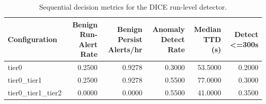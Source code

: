 \begin{table}[t]
\centering
\caption{Sequential decision metrics for the DICE run-level detector.}
\label{tab:dice_sequential_metrics}
\footnotesize
\begin{tabular}{lrrrrr}
\toprule
Configuration & Benign Run-Alert Rate & Benign Persist Alerts/hr & Anomaly Detect Rate & Median TTD (s) & Detect <=300s \\
\midrule
tier0 & 0.2500 & 0.9278 & 0.3000 & 53.5000 & 0.2000 \\
tier0_tier1 & 0.2500 & 0.9278 & 0.5500 & 77.0000 & 0.3000 \\
tier0_tier1_tier2 & 0.0000 & 0.0000 & 0.5500 & 41.0000 & 0.3500 \\
\bottomrule
\end{tabular}

\end{table}
